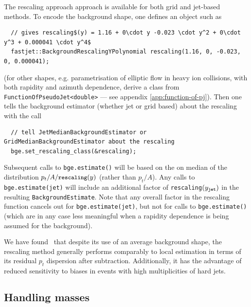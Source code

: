 \documentclass[12pt,a4]{article}
\newcommand{\ttt}[1]{{\small\texttt{#1}}}
\begin{document}
The rescaling approach approach is available for both grid and
jet-based methods.
%
To encode the background shape, one defines an object such as 
\begin{lstlisting}
  // gives rescaling$(y) = 1.16 + 0\cdot y -0.023 \cdot y^2 + 0\cdot y^3 + 0.000041 \cdot y^4$
  fastjet::BackgroundRescalingYPolynomial rescaling(1.16, 0, -0.023, 0, 0.000041);
\end{lstlisting}
(for other shapes, e.g. parametrisation of elliptic flow in heavy ion
collisions, with both rapidity and azimuth dependence, derive a class
from \ttt{FunctionOfPseudoJet<double>} --- see appendix
\ref{app:function-of-pj}). Then one tells the background estimator
(whether jet or grid based) about the rescaling with the call
\begin{lstlisting}
  // tell JetMedianBackgroundEstimator or GridMedianBackgroundEstimator about the rescaling
  bge.set_rescaling_class(&rescaling);
\end{lstlisting}
Subsequent calls to \ttt{bge.estimate()} will be based on the on median of
the distribution $p_t/A / \ttt{rescaling}(y)$ (rather than $p_t/A$).
%
Any calls to \ttt{bge.estimate(jet)} will include an additional factor of
\ttt{rescaling}$(y_\ttt{jet})$ in the resulting
\ttt{BackgroundEstimate}.
%
Note that any overall factor in the rescaling function cancels out for
\ttt{bge.estimate(jet)}, but not for calls to \ttt{bge.estimate()}
(which are in any case less meaningful when a rapidity dependence is
being assumed for the background).

We have found~\cite{Soyez:2018opl} that despite its
use of an average background shape, the rescaling method generally
performs comparably to local estimation in terms of its residual $p_t$
dispersion after subtraction.
%
Additionally, it has the advantage of reduced sensitivity to biases in
events with high multiplicities of hard jets.

\subsection{Handling masses}
\label{sec:BGE-masses}
\end{document}
